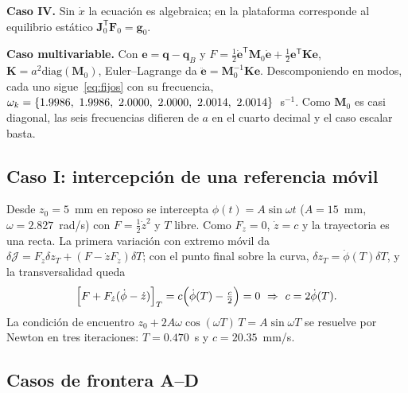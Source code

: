 \documentclass[conference]{IEEEtran}
\newcommand{\vect}[1]{\bm{#1}}
\newcommand{\T}{^{\mathsf{T}}}
\begin{document}
\textbf{Caso IV.} Sin $\dot x$ la ecuación es algebraica; en la plataforma corresponde al equilibrio estático $\vect J_0\T\vect F_0 = \vect g_0$.

\textbf{Caso multivariable.} Con $\vect e = \vect q - \vect q_B$ y $F = \frac12\dot{\vect e}\T\vect M_0\dot{\vect e} + \frac12\vect e\T\vect K\vect e$, $\vect K = a^2\mathrm{diag}(\vect M_0)$, Euler--Lagrange da $\ddot{\vect e} = \vect M_0^{-1}\vect K\vect e$. Descomponiendo en modos, cada uno sigue~\eqref{eq:fijos} con su frecuencia, $\omega_k = \{1.9986,\allowbreak\ 1.9986,\allowbreak\ 2.0000,\allowbreak\ 2.0000,\allowbreak\ 2.0014,\allowbreak\ 2.0014\}$~s$^{-1}$. Como $\vect M_0$ es casi diagonal, las seis frecuencias difieren de $a$ en el cuarto decimal y el caso escalar basta.

\subsection{Caso I: intercepción de una referencia móvil}

Desde $z_0 = 5$~mm en reposo se intercepta $\phi(t) = A\sin\omega t$ ($A = 15$~mm, $\omega = 2.827$~rad/s) con $F = \frac12\dot z^2$ y $T$ libre. Como $F_z = 0$, $\dot z = c$ y la trayectoria es una recta. La primera variación con extremo móvil da $\delta\mathcal J = F_{\dot z}\delta z_T + (F - \dot zF_{\dot z})\delta T$; con el punto final sobre la curva, $\delta z_T = \dot\phi(T)\delta T$, y la transversalidad queda
\begin{equation}
\Bigl[F + F_{\dot z}(\dot\phi - \dot z)\Bigr]_T = c\Bigl(\dot\phi(T) - \tfrac{c}{2}\Bigr) = 0\ \Rightarrow\ c = 2\dot\phi(T).
\end{equation}
La condición de encuentro $z_0 + 2A\omega\cos(\omega T)\,T = A\sin\omega T$ se resuelve por Newton en tres iteraciones: $T = 0.470$~s y $c = 20.35$~mm/s.

\subsection{Casos de frontera A--D}
\end{document}
